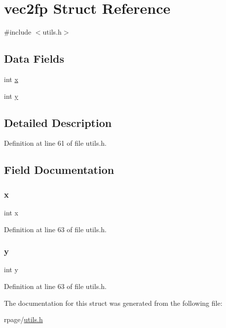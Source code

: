 \hypertarget{structvec2fp}{}\section{vec2fp Struct Reference}
\label{structvec2fp}


{\ttfamily \#include $<$utils.\+h$>$}

\subsection*{Data Fields}
\begin{DoxyCompactItemize}
\item 
int \mbox{\hyperlink{structvec2fp_a6150e0515f7202e2fb518f7206ed97dc}{x}}
\item 
int \mbox{\hyperlink{structvec2fp_a0a2f84ed7838f07779ae24c5a9086d33}{y}}
\end{DoxyCompactItemize}


\subsection{Detailed Description}


Definition at line 61 of file utils.\+h.



\subsection{Field Documentation}
\mbox{\label{structvec2fp_a6150e0515f7202e2fb518f7206ed97dc}} 
\subsubsection{\texorpdfstring{x}{x}}
{\footnotesize\ttfamily int x}



Definition at line 63 of file utils.\+h.

\mbox{\label{structvec2fp_a0a2f84ed7838f07779ae24c5a9086d33}} 
\subsubsection{\texorpdfstring{y}{y}}
{\footnotesize\ttfamily int y}



Definition at line 63 of file utils.\+h.



The documentation for this struct was generated from the following file\+:\begin{DoxyCompactItemize}
\item 
rpage/\mbox{\hyperlink{utils_8h}{utils.\+h}}\end{DoxyCompactItemize}
